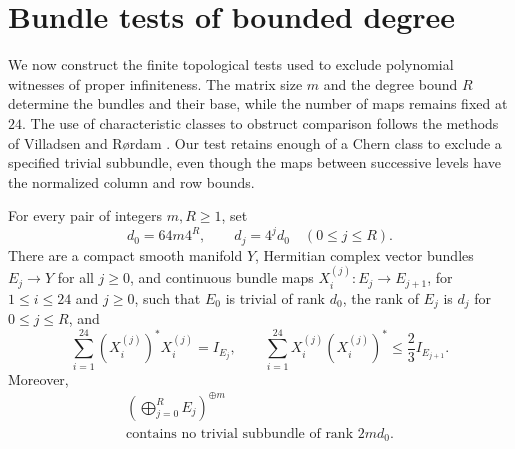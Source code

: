 \section{Bundle tests of bounded degree}
\label{sec:bundle-tests}

We now construct the finite topological tests used to exclude polynomial
witnesses of proper infiniteness.  The matrix size $m$ and the degree bound
$R$ determine the bundles and their base, while the number of maps remains
fixed at $24$.
The use of characteristic classes to obstruct comparison follows the
methods of Villadsen \cite[Section~3]{Villadsen1999} and R{\o}rdam
\cite[Sections~3--4]{Rordam2003}. Our test retains enough of a Chern
class to exclude a specified trivial subbundle, even though the maps
between successive levels have the normalized column and row bounds.

\begin{proposition}\label{prop:bundle-test}
For every pair of integers $m,R\geq 1$, set
\begin{equation}\label{eq:test-ranks}
 d_0=64m4^R,\qquad d_j=4^j d_0\quad(0\leq j\leq R).
\end{equation}
There are a compact smooth manifold $Y$, Hermitian complex vector bundles
$E_j\to Y$ for all $j\geq0$, and continuous bundle maps
$X_i^{(j)}:E_j\to E_{j+1}$, for $1\leq i\leq24$ and $j\geq0$, such that
$E_0$ is trivial of rank $d_0$, the rank of $E_j$ is $d_j$ for
$0\leq j\leq R$, and
\begin{equation}\label{bundle:scaled-identities}
 \sum_{i=1}^{24}(X_i^{(j)})^*X_i^{(j)}=I_{E_j},
 \qquad
 \sum_{i=1}^{24}X_i^{(j)}(X_i^{(j)})^*
 \leq\frac23 I_{E_{j+1}}.
\end{equation}
Moreover,
\begin{equation}\label{eq:chern-obstruction}
 \begin{gathered}
 \left(\bigoplus_{j=0}^R E_j\right)^{\oplus m}\\
 \text{contains no trivial subbundle of rank }2md_0.
 \end{gathered}
\end{equation}
\end{proposition}

